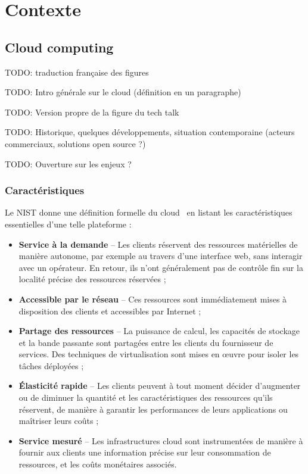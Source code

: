 \clearemptydoublepage
\chapter{Contexte}
\label{chapter:context}

\section{Cloud computing}

TODO: traduction française des figures

TODO: Intro générale sur le cloud (définition en un paragraphe)

TODO: Version propre de la figure du tech talk

TODO: Historique, quelques développements, situation contemporaine (acteurs commerciaux, solutions open source ?)

TODO: Ouverture sur les enjeux ?

\subsection{Caractéristiques}

Le NIST donne une définition formelle du cloud~\cite{mellNISTDefinitionCloud} en listant les caractéristiques essentielles d'une telle plateforme :

\begin{itemize}
    \item \textbf{Service à la demande} -- Les clients réservent des ressources matérielles de manière autonome, par exemple au travers d'une interface web, sans interagir avec un opérateur. En retour, ils n'ont généralement pas de contrôle fin sur la localité précise des ressources réservées ;
    \item \textbf{Accessible par le réseau} -- Ces ressources sont immédiatement mises à disposition des clients et accessibles par Internet ;
    \item \textbf{Partage des ressources} -- La puissance de calcul, les capacités de stockage et la bande passante sont partagées entre les clients du fournisseur de services. Des techniques de virtualisation sont mises en œuvre pour isoler les tâches déployées ;
    \item \textbf{Élasticité rapide} -- Les clients peuvent à tout moment décider d'augmenter ou de diminuer la quantité et les caractéristiques des ressources qu'ils réservent, de manière à garantir les performances de leurs applications ou maîtriser leurs coûts ;
    \item \textbf{Service mesuré} -- Les infrastructures cloud sont instrumentées de manière à fournir aux clients une information précise sur leur consommation de ressources, et les coûts monétaires associés.
\end{itemize}

